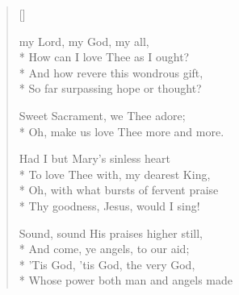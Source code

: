 \newHymn
{}

\begin{verse}[\versewidth]

 my Lord, my God, my all,\\*
How can I love Thee as I ought?\\*
And how revere this wondrous gift,\\*
So far surpassing hope or
thought?

\begin{patverse}
 \vin Sweet Sacrament, we Thee adore;\\*
\vin Oh, make us love Thee more and more. 
\end{patverse}

 Had I but Mary's sinless heart\\*
To love Thee with, my dearest King,\\*
Oh, with what bursts of fervent praise\\*
Thy goodness, Jesus, would I sing!






 Sound, sound His praises higher still,\\*
And come, ye angels, to our aid;\\*
'Tis God, 'tis God, the very God,\\*
Whose power both man and angels made

\end{verse}

